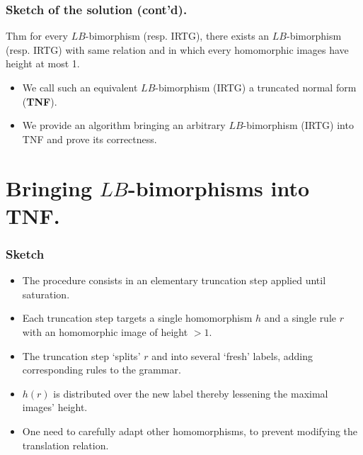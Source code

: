 \documentclass{beamer}
\begin{document}
\begin{frame}
  \frametitle{Sketch of the solution (cont'd).}
  
  \begin{block}{Thm}
    for every $LB$-bimorphism (resp. IRTG), there exists an $LB$-bimorphism (resp. IRTG) with same relation and in which every homomorphic images have height at most 1. 
  \end{block}

  \begin{itemize}
  \item We call such an equivalent $LB$-bimorphism (IRTG) a truncated normal form (\textbf{TNF}).
  \item We provide an algorithm bringing an arbitrary $LB$-bimorphism (IRTG) into TNF and prove its correctness.
  \end{itemize}
 
  
\end{frame}

\section{Bringing $LB$-bimorphisms into TNF.}

\begin{frame}
  \frametitle{Sketch}

  \begin{itemize}
  \item The procedure consists in an elementary truncation step applied until saturation.
  \item Each truncation step targets a single homomorphism $h$ and a single rule $r$ with an homomorphic image of height $ > 1$.
  \item The truncation step `splits' $r$ and into several `fresh' labels, adding corresponding rules to the grammar.
  \item $h(r)$ is distributed over the new label thereby lessening the maximal images' height.
  \item One need to carefully adapt other homomorphisms, to prevent modifying the translation relation.
  \end{itemize}
\end{frame}
\end{document}

